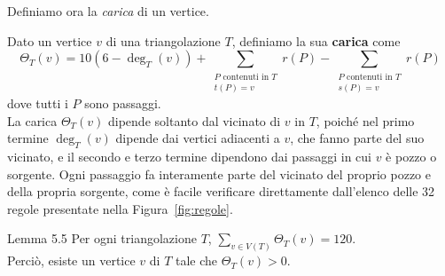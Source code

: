 \documentclass[a4paper,12pt,titlepage]{report}
\begin{document}
    Definiamo ora la \emph{carica} di un vertice.
    \begin{dfn}
    	Dato un vertice $v$ di una triangolazione $T$, definiamo la sua {\bfseries carica} come
    	\[
    	 \Theta_T(v) = 10(6 - \deg_T(v)) + \sum_{\substack{P \text{ contenuti in } T \\ t(P) = v}} r(P) - \sum_{\substack{P \text{ contenuti in } T \\ s(P) = v}} r(P)
    	\]
    	dove tutti i $P$ sono passaggi.
        \\La carica $\Theta_T(v)$ dipende soltanto dal vicinato di $v$ in $T$, poiché nel primo termine $\deg_T(v)$ dipende dai vertici adiacenti a $v$, che fanno parte del suo vicinato, e il secondo e terzo termine dipendono dai passaggi in cui $v$ è pozzo o sorgente. Ogni passaggio fa interamente parte del vicinato del proprio pozzo e della propria sorgente, come è facile verificare direttamente dall'elenco delle 32 regole presentate nella Figura~\ref{fig:regole}.
    \end{dfn}
    \begin{namedthm*}{Lemma 5.5}
    	Per ogni triangolazione $T$, $\sum_{v \in V(T)} \Theta_T(v) = 120$.
    	\\Perciò, esiste un vertice $v$ di $T$ tale che $\Theta_T(v) > 0$.
    \end{namedthm*}
\end{document}
